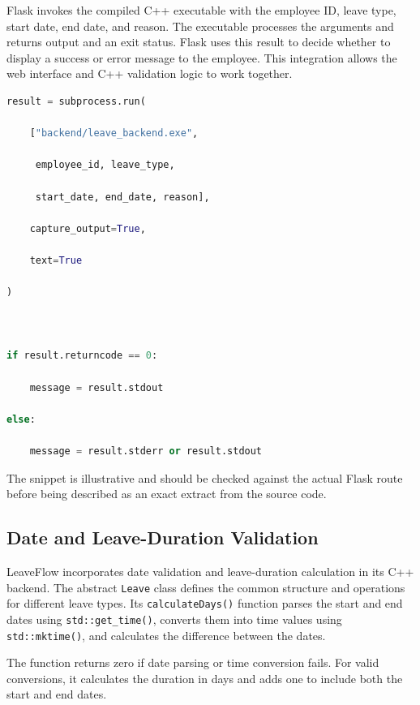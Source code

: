 \documentclass[12pt,a4paper,oneside]{book}
\begin{document}
Flask invokes the compiled C++ executable with the employee ID, leave type, start date, end date, and reason. The executable processes the arguments and returns output and an exit status. Flask uses this result to decide whether to display a success or error message to the employee. This integration allows the web interface and C++ validation logic to work together.



\begin{lstlisting}[language=Python,caption={Handling the C++ backend result},label={code:example-3}]
result = subprocess.run(

    ["backend/leave_backend.exe",

     employee_id, leave_type,

     start_date, end_date, reason],

    capture_output=True,

    text=True

)



if result.returncode == 0:

    message = result.stdout

else:

    message = result.stderr or result.stdout
\end{lstlisting}



The snippet is illustrative and should be checked against the actual Flask route before being described as an exact extract from the source code.



\subsection{Date and Leave-Duration Validation}



LeaveFlow incorporates date validation and leave-duration calculation in its C++ backend. The abstract \texttt{Leave} class defines the common structure and operations for different leave types. Its \texttt{calculateDays()} function parses the start and end dates using \texttt{std::get\_time()}, converts them into time values using \texttt{std::mktime()}, and calculates the difference between the dates.



The function returns zero if date parsing or time conversion fails. For valid conversions, it calculates the duration in days and adds one to include both the start and end dates.
\end{document}
